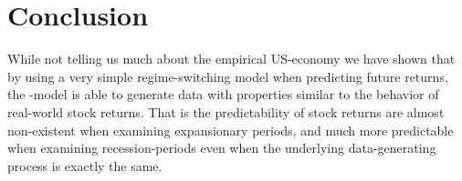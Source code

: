 \section{Conclusion} \label{sec:Conclusion}
While not telling us much about the empirical US-economy we have shown that by using a very simple regime-switching model when predicting future returns, the \citet{Campbell1999}-model is able to generate data with properties similar to the behavior of real-world stock returns. That is the predictability of stock returns are almost non-existent when examining expansionary periods, and much more predictable when examining recession-periods even when the underlying data-generating process is exactly the same. 